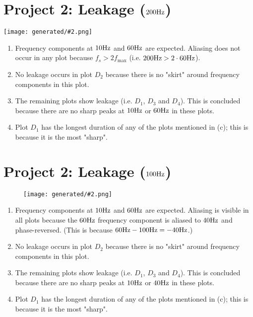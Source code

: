\documentclass{ajhlabreport}
\newcommand{\generatedfigw}[2]{
	\texttt{[image: generated/\#2.png]}
}
\begin{document}
\chapter{Project 2: Leakage ($200\hertz$)}


\generatedfigw{1}{p2-200hz}
\renewcommand{\labelenumi}{(\alph{enumi})}
\begin{enumerate}
\item Frequency components at $10\hertz$ and $60\hertz$ are expected. Aliasing
does not occur in any plot because $f_s > 2 f_\text{max}$ (i.e. $200\hertz >
2\cdot60\hertz$).
\item No leakage occurs in plot $D_2$ because there is no "skirt" around
frequency components in this plot.
\item The remaining plots show leakage (i.e. $D_1$, $D_3$ and $D_4$). This is
concluded because there are no sharp peaks at $10\hertz$ or $60\hertz$ in these
plots.
\item Plot $D_1$ has the longest duration of any of the plots mentioned in (c);
this is because it is the most "sharp".
\end{enumerate}
\newpage



\chapter{Project 2: Leakage ($100\hertz$)}

\begin{figure}[H]
\centering
\generatedfigw{1}{p2-100hz}
\end{figure}
%
\renewcommand{\labelenumi}{(\alph{enumi})}
\begin{enumerate}
%
\item Frequency components at $10\hertz$ and $60\hertz$ are expected. Aliasing
is visible in all plots because the $60\hertz$ frequency component is aliased to
$40\hertz$ and phase-reversed. (This is because $60\hertz - 100\hertz =
-40\hertz$.)
%
\item No leakage occurs in plot $D_2$ because there is no "skirt" around
frequency components in this plot.
%
\item The remaining plots show leakage (i.e. $D_1$, $D_3$ and $D_4$). This is
concluded because there are no sharp peaks at $10\hertz$ or $40\hertz$ in these
plots.
%
\item Plot $D_1$ has the longest duration of any of the plots mentioned in (c);
this is because it is the most "sharp".
%
\end{enumerate}
\newpage
\end{document}
